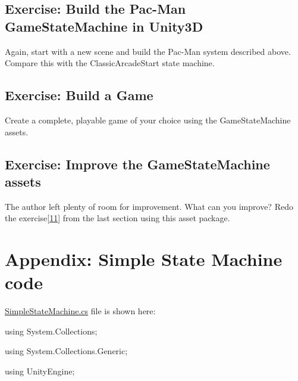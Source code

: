\subsection[Exercise: Build the Pac-Man GameStateMachine in
Unity3D]{\texorpdfstring{\protect\hypertarget{anchor-19}{}{}Exercise:
Build the Pac-Man GameStateMachine in
Unity3D}{Exercise: Build the Pac-Man GameStateMachine in Unity3D}}\label{exercise-build-the-pac-man-gamestatemachine-in-unity3d}

Again, start with a new scene and build the Pac-Man system described
above. Compare this with the ClassicArcadeStart state machine.

\subsection[Exercise: Build a
Game]{\texorpdfstring{\protect\hypertarget{anchor-20}{}{}Exercise: Build
a Game}{Exercise: Build a Game}}\label{exercise-build-a-game}

Create a complete, playable game of your choice using the
GameStateMachine assets.

\subsection[Exercise: Improve \textbf{the} GameStateMachine
assets]{\texorpdfstring{\protect\hypertarget{anchor-21}{}{}Exercise:
Improve \textbf{the} GameStateMachine
assets}{Exercise: Improve the GameStateMachine assets}}\label{exercise-improve-the-gamestatemachine-assets}

The author left plenty of room for improvement. What can you improve?
Redo the exercise{[}\protect\hyperlink{anchor-15}{11}{]} from the last
section using this asset package.

\section[Appendix: Simple State Machine
code]{\texorpdfstring{\protect\hypertarget{anchor-13}{}{}Appendix:
Simple State Machine
code}{Appendix: Simple State Machine code}}\label{appendix-simple-state-machine-code}

\href{https://gist.github.com/tdvance/15aee1cfccecc49c2ce51c038b064120}{SimpleStateMachine.cs}
file is shown here:

using System.Collections;

using System.Collections.Generic;

using UnityEngine;

